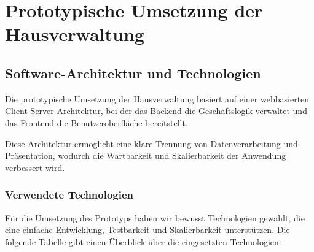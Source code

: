 \section{Prototypische Umsetzung der Hausverwaltung}\label{Prototypische Umsetzung der Hausverwaltung}


\subsection{Software-Architektur und Technologien}



Die prototypische Umsetzung der Hausverwaltung basiert auf einer webbasierten Client-Server-Architektur, bei der das Backend die Geschäftslogik verwaltet und das Frontend die Benutzeroberfläche bereitstellt.\par
Diese Architektur ermöglicht eine klare Trennung von Datenverarbeitung und Präsentation, wodurch die Wartbarkeit und Skalierbarkeit der Anwendung verbessert wird.\par

\subsubsection{Verwendete Technologien}

Für die Umsetzung des Prototyps haben wir bewusst Technologien gewählt, die eine einfache Entwicklung, Testbarkeit und Skalierbarkeit unterstützen.
Die folgende Tabelle gibt einen Überblick über die eingesetzten Technologien:

